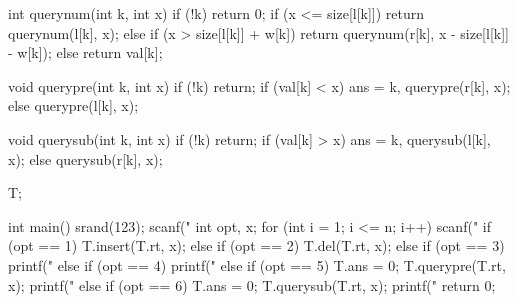 \begin{cppcode}
{  int querynum(int k, int x) {
    if (!k) return 0;
    if (x <= size[l[k]])
      return querynum(l[k], x);
    else if (x > size[l[k]] + w[k])
      return querynum(r[k], x - size[l[k]] - w[k]);
    else
      return val[k];
  }

  void querypre(int k, int x) {
    if (!k) return;
    if (val[k] < x)
      ans = k, querypre(r[k], x);
    else
      querypre(l[k], x);
  }

  void querysub(int k, int x) {
    if (!k) return;
    if (val[k] > x)
      ans = k, querysub(l[k], x);
    else
      querysub(r[k], x);
  }
} T;

int main() {
  srand(123);
  scanf("%
  int opt, x;
  for (int i = 1; i <= n; i++) {
    scanf("%
    if (opt == 1)
      T.insert(T.rt, x);
    else if (opt == 2)
      T.del(T.rt, x);
    else if (opt == 3) {
      printf("%
    } else if (opt == 4) {
      printf("%
    } else if (opt == 5) {
      T.ans = 0;
      T.querypre(T.rt, x);
      printf("%
    } else if (opt == 6) {
      T.ans = 0;
      T.querysub(T.rt, x);
      printf("%
    }
  }
  return 0;
}
\end{cppcode}
